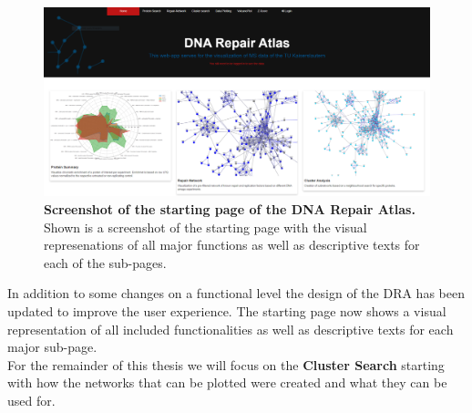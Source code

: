\begin{figure}[H]
    \centering
    \includegraphics[width=\textwidth]{resources/images/Results/home.PNG}
    \caption[Screenshot of the starting page of the DNA Repair Atlas]{\textbf{Screenshot of the starting page of the DNA Repair Atlas. }Shown is a screenshot of the starting page with the visual represenations of all major functions as well as descriptive texts for each of the sub-pages.}
    \label{fig:home}
\end{figure}
In addition to some changes on a functional level the design of the DRA has been updated to improve the user experience. The starting page now shows a visual representation of all included functionalities as well as descriptive texts for each major sub-page.\\
For the remainder of this thesis we will focus on the \textbf{Cluster Search} starting with how the networks that can be plotted were created and what they can be used for.

